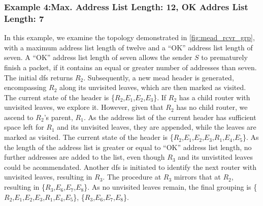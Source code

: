 \subsubsection{Example 4:\quad Max. Address List Length: 12, OK Addres List Length: 7}
\label{sec:Max 12 Ok 7}
In this example, we examine the topology demonstrated in \autoref{fig:mead_rcvr_grp},
    with a maximum address list length of twelve and a ``OK'' address list length
    of seven.
A ``OK'' address list length of seven allows the sender $S$ to prematurely finish
    a packet, if it contains an equal or greater number of addresses than seven.
The initial \gls{dfs} returns $R_2$.
Subsequently, a new \gls{mead} header is generated, encompassing $R_2$ along its
    unvisited leaves, which are then marked as visited.
The current state of the header is \{$R_2$,$E_1$,$E_2$,$E_3$\}.
If $R_2$ has a child router with unvisited leaves, we explore it.
However, given that $R_2$ has no child router, we ascend to $R_2$'s parent, $R_1$.
As the address list of the current header has sufficient space left for $R_1$
    and its unvisited leaves, they are appended, while the leaves are marked as
    visited.
The current state of the header is \{$R_2$,$E_1$,$E_2$,$E_3$,$R_1$,$E_4$,$E_5$\}.
As the length of the address list is greater or equal to ``OK'' address list
    length, no further addresses are added to the list, even though $R_3$ and
    its unvistited leaves could be acommendated.
Another \gls{dfs} is initiated to identify the next router with unvisited leaves,
    resulting in $R_3$.
The procedure at $R_3$ mirrors that at $R_2$, resulting in
    \{$R_3$,$E_6$,$E_7$,$E_8$\}.
As no unvisited leaves remain, the final grouping is
    \{$R_2$,$E_1$,$E_2$,$E_3$,$R_1$,$E_4$,$E_5$\}, \{$R_3$,$E_6$,$E_7$,$E_8$\}.

